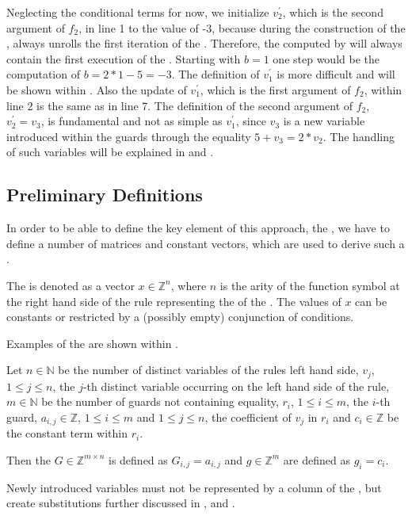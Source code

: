 Neglecting the conditional terms for now, we initialize  $v^\prime_2$, which is the second argument of $f_2$, in line 1 to the value of -3, 
because during the construction of the \seg, \aprove always unrolls the first iteration of the \loopt. Therefore, the \stem computed by \aprove will always contain the first execution of the \loopt. Starting with $b=1$ one step would be the computation of $b = 2*1-5=-3$. The definition of $v^\prime_1$ is more difficult and will be shown within .
Also the update of  $v^\prime_1$, which is the first argument of $f_2$, within line 2 is the same as in  line 7. The definition of the second argument of $f_2$, $v^\prime_2 = v_3$, is fundamental and not as simple as $v^\prime_1$, since $v_3$ is a new variable introduced within the guards through the equality $5+v_3=2*v_2$. The handling of such variables will be explained in  and . \newline

\subsection{Preliminary Definitions}
In order to be able to define the key element of this approach, the \gna, we have to define a number of matrices and constant vectors, which are used to derive such a \gna. 

\begin{definition}[\stem]
	The \stem is denoted as a vector $x \in \mathbb{Z}^n$, where $n$ is the arity of the function symbol at the right hand side of the rule representing the \stem of the \its. The values of $x$ can be constants or restricted by a (possibly empty) conjunction of conditions. 
\end{definition}
Examples of the \stem are shown within .

\begin{definition}
	\label{def:guard}
	Let $n \in \mathbb{N}$ be the number of distinct variables of the \loopt rules left hand side, $v_j$, $1 \le j \le n$, the $j$-th distinct variable occurring on the left hand side of the rule, $m \in \mathbb{N}$ be the number of guards not containing equality, $r_i$, $1\le i \le m$, the $i$-th guard, $a_{i,j} \in \mathbb{Z}$, $1 \le i \le m$ and $1\le j \le n$, the coefficient of $v_j$ in $r_i$ and $c_i \in \mathbb{Z}$ be the constant term within $r_i$.
	
	Then the \guardmatrix $G \in \mathbb{Z}^{m\times n}$ is defined as $G_{i,j}=a_{i,j} $ and \guardconstants $g \in \mathbb{Z}^m$ are defined as $g_i = c_i$.
	
	Newly introduced variables must not be represented by a column of the \guardmatrix, but create substitutions further discussed in ,  and .
\end{definition}

